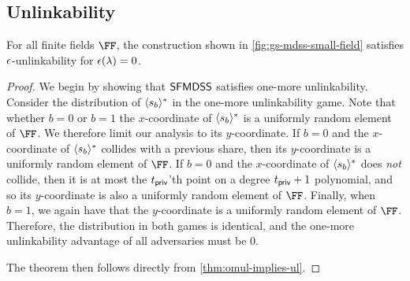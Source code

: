 \subsection{Unlinkability}

\newcommand{\challengeShare}{\ensuremath{\mdssShare{\mdssSecret_b}^*}}

\begin{theorem}
	For all finite fields $\FF$, the construction shown in \cref{fig:gs-mdss-small-field} satisfies $\epsilon$-unlinkability for $\epsilon(\lambda) = 0$.
\end{theorem}
\begin{proof}
	We begin by showing that $\mathsf{SFMDSS}$ satisfies one-more unlinkability.
	Consider the distribution of $\challengeShare$ in the one-more unlinkability game.
	Note that whether $b = 0$ or $b = 1$ the $x$-coordinate of $\challengeShare$ is a uniformly random element of $\FF$.
	We therefore limit our analysis to its $y$-coordinate.
	If $b = 0$ and the $x$-coordinate of $\challengeShare$ collides with a previous share, then its $y$-coordinate is a uniformly random element of $\FF$.
	If $b = 0$ and the $x$-coordinate of $\challengeShare$ does \emph{not} collide, then it is at most the $t_{\mathsf{priv}}$'th point on a degree $t_{\mathsf{priv}} +1$ polynomial, and so its $y$-coordinate is also a uniformly random element of $\FF$.
	Finally, when $b = 1$, we again have that the $y$-coordinate is a uniformly random element of $\FF$.
	Therefore, the distribution in both games is identical, and the one-more unlinkability advantage of all adversaries must be $0$.

	The theorem then follows directly from \cref{thm:omul-implies-ul}.
\end{proof}

